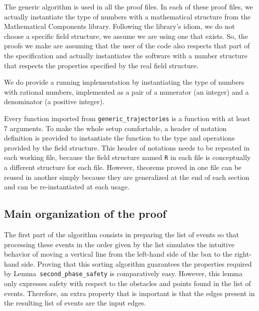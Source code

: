 \documentclass[a4paper, USenglish, cleveref, autoref, thm-restate, final]{lipics-v2021}
\begin{document}
The generic algorithm is used in all the proof files.  In each of
these proof files, we actually instantiate the type of numbers with
a mathematical structure from the {\sc Mathematical Components} library.
Following the library's idiom, we do not choose a specific field structure,
we assume we are using one that exists.  So, the proofs we make are assuming
that the user of the code also respects that part of the specification and
actually instantiates the software with a number structure that respects the
properties specified by the real field structure.

We do provide a running implementation by instantiating the
type of numbers with rational numbers, implemented as a pair of a numerator
(an integer) and a denominator (a positive integer).

Every function imported from {\tt generic\_trajectories} is a function
with at least 7 arguments.  To make the whole setup comfortable, a
header of notation definition is provided to instantiate the function
to the type and operations provided by the field structure.  This header of
notations needs to be repeated in each working file, because the field
structure named {\tt R} in each file is conceptually a different structure
for each file.   However, theorems proved in one file can be reused in another
simply because they are generalized at the end of each section and can be
re-instantiated at each usage.

\subsection{Main organization of the proof}
\label{sec:invariant_levels}
The first part of the algorithm consists in preparing the list of
events so that processing these events in the order given by the list
simulates the intuitive behavior of moving a vertical line
from the left-hand side of the box to the right-hand
side.  Proving that this sorting algorithm guarantees the properties
required by Lemma~{\tt second\_phase\_safety} is comparatively easy.
However, this lemma only expresses safety with respect to the obstacles and
points found in the list of events.  Therefore, an extra property that is
important is that the edges present in the resulting
list of events are the input edges.
\end{document}
